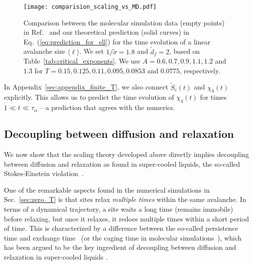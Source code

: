 \documentclass[pre,twocolumn,superscriptaddress,tightenlines,showpacs,longbibliography,floatfix,footinbib]{revtex4-1}
\begin{document}
\begin{figure}
\centering
\texttt{[image: comparision\_scaling\_vs\_MD.pdf]}
\caption{Comparison between the molecular simulation data (empty points) in Ref.~\cite{scalliet2022thirty} and our theoretical prediction (solid curves) in Eq.~(\ref{eq:prediction_for_ell}) for the time evolution of a linear avalanche size $\langle \ell \rangle$. We set $1/\tilde \sigma=1.8$ and $\tilde d_f=2$, based on Table~\ref{tab:critical_exponents}.
We use $A=0.6, 0.7, 0.9, 1.1, 1.2$ and $1.3$ for $T=0.15, 0.125, 0.11, 0.095, 0.0853$ and $0.0775$, respectively.}
\label{fig:MD_vs_prediction}
\end{figure}



In Appendix~\ref{sec:appendix_finite_T}, we also connect $\tilde S_c(t)$ and $\chi_4(t)$ explicitly. This allows us to predict the time evolution of $\chi_4(t)$ for times $1\ll t \ll \tau_\alpha$ -- a prediction that agrees with the numerics.


\subsection{Decoupling between diffusion and relaxation}

We now show that the scaling theory developed above directly implies  decoupling between diffusion and relaxation as found in super-cooled liquids, the so-called Stokes-Einstein violation~\cite{tarjus1995breakdown,ediger2000spatially,sengupta2013breakdown,charbonneau2014hopping,kawasaki2017identifying}.

One of the remarkable aspects found in the numerical simulations in Sec.~\ref{sec:zero_T} is that sites relax {\it multiple times} within the same avalanche. In terms of a dynamical trajectory, a site waits a long time (remains immobile) before relaxing, but once it relaxes, it redoes multiple times within a short period of time. This is characterized by a difference between the so-called persistence time and exchange time~\cite{jung2004excitation,berthier2004length,hedges2007decoupling} (or the caging time in molecular simulations~\cite{ciamarra2016particle,pastore2021breakdown}), which has been argued to be the key ingredient of decoupling between diffusion and relaxation in super-cooled liquids \cite{jung2004excitation,berthier2004length,hedges2007decoupling,chaudhuri2007universal,pastore2021breakdown}. 
\end{document}
